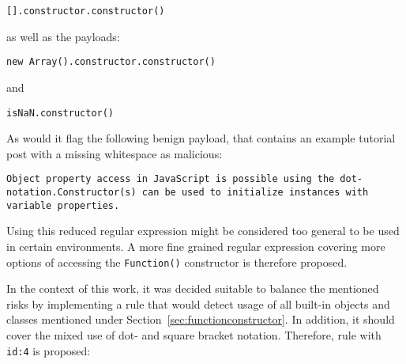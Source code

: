 \begin{lstlisting}[style=basicStyle]
[].constructor.constructor()
\end{lstlisting}
as well as the payloads:

\begin{lstlisting}[style=basicStyle]
new Array().constructor.constructor()
\end{lstlisting}
and

\begin{lstlisting}[style=basicStyle]
isNaN.constructor()
\end{lstlisting}
As would it flag the following benign payload, that contains an example tutorial post with a missing whitespace as malicious:

\begin{lstlisting}[style=basicStyle]
Object property access in JavaScript is possible using the dot-notation.Constructor(s) can be used to initialize instances with variable properties.
\end{lstlisting}
Using this reduced regular expression might be considered too general to be used in certain environments. A more fine grained regular expression covering more options of accessing the \verb|Function()| constructor is therefore proposed. 

In the context of this work, it was decided suitable to balance the mentioned risks by implementing a rule that would detect usage of all built-in objects and classes mentioned under Section~\ref{sec:functionconstructor}. In addition, it should cover the mixed use of dot- and square bracket notation. Therefore, rule with \verb|id:4| is proposed: 

